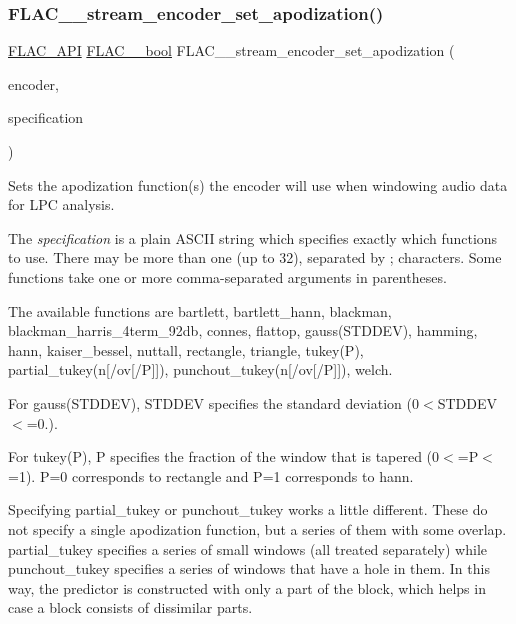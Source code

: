 \subsubsection{\texorpdfstring{FLAC\_\_stream\_encoder\_set\_apodization()}{FLAC\_\_stream\_encoder\_set\_apodization()}}
{\footnotesize\ttfamily \mbox{\hyperlink{group__flac__export_ga56ca07df8a23310707732b1c0007d6f5}{F\+L\+A\+C\+\_\+\+A\+PI}} \mbox{\hyperlink{ordinals_8h_a95103469f1cbd78b8cf250194985b34e}{F\+L\+A\+C\+\_\+\+\_\+bool}} F\+L\+A\+C\+\_\+\+\_\+stream\+\_\+encoder\+\_\+set\+\_\+apodization (\begin{DoxyParamCaption}\item[{\mbox{\hyperlink{struct_f_l_a_c_____stream_encoder}{F\+L\+A\+C\+\_\+\+\_\+\+Stream\+Encoder}} $\ast$}]{encoder,  }\item[{const char $\ast$}]{specification }\end{DoxyParamCaption})}

Sets the apodization function(s) the encoder will use when windowing audio data for L\+PC analysis.

The {\itshape specification} is a plain A\+S\+C\+II string which specifies exactly which functions to use. There may be more than one (up to 32), separated by {\ttfamily \textquotesingle{}};\textquotesingle{} characters. Some functions take one or more comma-\/separated arguments in parentheses.

The available functions are {\ttfamily bartlett}, {\ttfamily bartlett\+\_\+hann}, {\ttfamily blackman}, {\ttfamily blackman\+\_\+harris\+\_\+4term\+\_\+92db}, {\ttfamily connes}, {\ttfamily flattop}, {\ttfamily gauss(\+S\+T\+D\+D\+E\+V)}, {\ttfamily hamming}, {\ttfamily hann}, {\ttfamily kaiser\+\_\+bessel}, {\ttfamily nuttall}, {\ttfamily rectangle}, {\ttfamily triangle}, {\ttfamily tukey(\+P)}, {\ttfamily partial\+\_\+tukey}(n\mbox{[}/ov\mbox{[}/P\mbox{]}\mbox{]}), {\ttfamily punchout\+\_\+tukey}(n\mbox{[}/ov\mbox{[}/P\mbox{]}\mbox{]}), {\ttfamily welch}.

For {\ttfamily gauss(\+S\+T\+D\+D\+E\+V)}, S\+T\+D\+D\+EV specifies the standard deviation (0$<$S\+T\+D\+D\+EV$<$=0.).

For {\ttfamily tukey(\+P)}, P specifies the fraction of the window that is tapered (0$<$=P$<$=1). P=0 corresponds to {\ttfamily rectangle} and P=1 corresponds to {\ttfamily hann}.

Specifying {\ttfamily partial\+\_\+tukey} or {\ttfamily punchout\+\_\+tukey} works a little different. These do not specify a single apodization function, but a series of them with some overlap. partial\+\_\+tukey specifies a series of small windows (all treated separately) while punchout\+\_\+tukey specifies a series of windows that have a hole in them. In this way, the predictor is constructed with only a part of the block, which helps in case a block consists of dissimilar parts.

